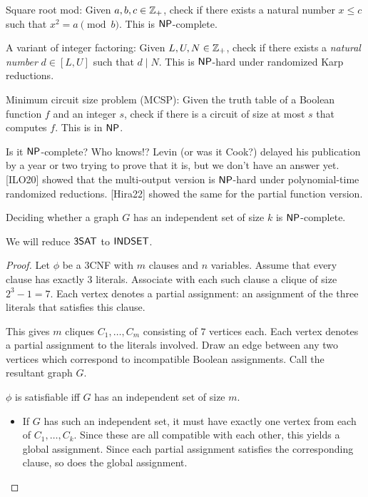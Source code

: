 \begin{examples}
    \item Square root mod: Given $a, b, c \in \mathbb{Z}_+$, check if there exists a
        natural number $x \le c$ such that $x^2 = a \pmod b$.
        This is $\mathsf{NP}$-complete.
    \item A variant of integer factoring:
        Given $L, U, N \in \mathbb{Z}_+$, check if there exists a 
        \emph{natural number} $d \in [L, U]$ such that $d \mid N$.
        This is $\mathsf{NP}$-hard under randomized Karp reductions.
    \item Minimum circuit size problem (MCSP):
        Given the truth table of a Boolean function $f$ and an integer $s$,
        check if there is a circuit of size at most $s$ that computes $f$.
        This is in $\mathsf{NP}$.

        Is it $\mathsf{NP}$-complete? Who knows!?
        Levin (or was it Cook?) delayed his publication by a year or two
        trying to prove that it is, but we don't have an answer yet.
        [ILO20] showed that the multi-output version is $\mathsf{NP}$-hard under
        polynomial-time randomized reductions.
        [Hira22] showed the same for the partial function version.
\end{examples}

\begin{theorem} \label{thm:is-npc}
    Deciding whether a graph $G$ has an independent set of size $k$ is
    $\mathsf{NP}$-complete.
\end{theorem}
We will reduce $\mathsf{3SAT}$ to $\mathsf{INDSET}$.
\begin{proof}
    Let $\phi$ be a $3$CNF with $m$ clauses and $n$ variables.
    Assume that every clause has exactly $3$ literals.
    Associate with each such clause a clique of size $2^3 - 1 = 7$.
    Each vertex denotes a partial assignment: an assignment of the three
    literals that satisfies this clause.

    This gives $m$ cliques $C_1, \dots, C_m$ consisting of $7$ vertices
    each.
    Each vertex denotes a partial assignment to the literals involved.
    Draw an edge between any two vertices which correspond to incompatible
    Boolean assignments.
    Call the resultant graph $G$.

    $\phi$ is satisfiable iff $G$ has an independent set of size $m$.
    \begin{itemize}
        \item If $G$ has such an independent set, it must have exactly one
            vertex from each of $C_1, \dots, C_k$.
            Since these are all compatible with each other, this yields
            a global assignment.
            Since each partial assignment satisfies the corresponding
            clause, so does the global assignment.
    \end{itemize}
\end{proof}

